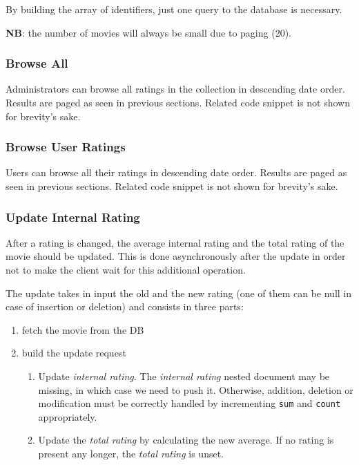 \documentclass[11pt]{article}
\begin{document}
By building the array of identifiers, just one query to the database is necessary.

\textbf{NB}: the number of movies will always be small due to paging (20).



\subsubsection{Browse All}
Administrators can browse all ratings in the collection in descending date order. Results are paged as seen in previous sections. Related code snippet is not shown for brevity's sake.

\subsubsection{Browse User Ratings}
Users can browse all their ratings in descending date order. Results are paged as seen in previous sections. Related code snippet is not shown for brevity's sake.

\subsubsection{Update Internal Rating}
\label{sssec:updateInternalRating}
After a rating is changed, the average internal rating and the total rating of the movie should be updated. This is done asynchronously after the update in order not to make the client wait for this additional operation.

The update takes in input the old and the new rating (one of them can be null in case of insertion or deletion) and consists in three parts:
\begin{enumerate}
	\item fetch the movie from the DB
	\item build the update request
	\begin{enumerate}
		\item Update \emph{internal rating}. The \emph{internal rating} nested document may be missing, in which case we need to push it. Otherwise, addition, deletion or modification must be correctly handled by incrementing \texttt{sum} and \texttt{count} appropriately.
		\item Update the \emph{total rating} by calculating the new average. If no rating is present any longer, the \emph{total rating} is unset.
	\end{enumerate}
\end{enumerate}
\end{document}
